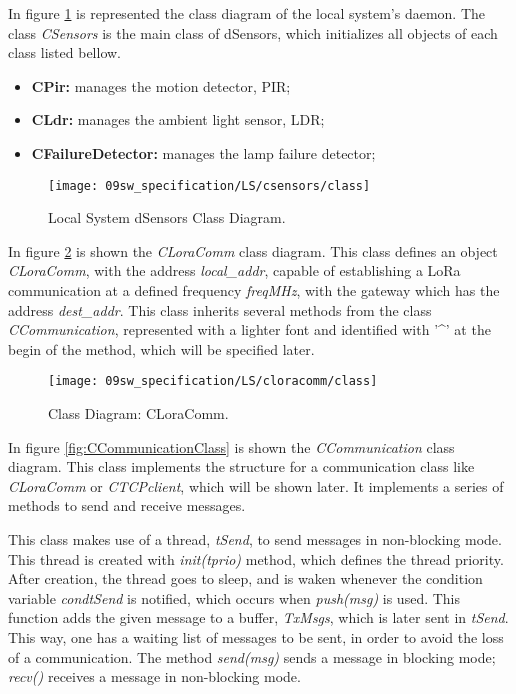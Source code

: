 \clearpage
In figure \ref{fig:csensors} is represented the class diagram of the local system's daemon. The class \textit{CSensors} is the main class of dSensors, which initializes all objects of each class listed bellow.

\begin{itemize}
	\item \textbf{CPir:} manages the motion detector, PIR;
	\item \textbf{CLdr:} manages the ambient light sensor, LDR;
	\item \textbf{CFailureDetector:} manages the lamp failure detector;
\end{itemize}

\begin{figure}[H]
	\centering
	\texttt{[image: 09sw\_specification/LS/csensors/class]}
	\caption{Local System dSensors Class Diagram.}
	\label{fig:csensors}
\end{figure}

\clearpage
{}

In figure \ref{fig:LoraCommClass} is shown the \textit{CLoraComm} class diagram. This class defines an object \textit{CLoraComm}, with the address \textit{local\_addr}, capable of establishing a LoRa communication at a defined frequency \textit{freqMHz}, with the gateway which has the address \textit{dest\_addr}. This class inherits several methods from the class \textit{CCommunication}, represented with a lighter font and identified with '\^{}' at the begin of the method, which will be specified later.

\begin{figure}[H]
	\centering
	\texttt{[image: 09sw\_specification/LS/cloracomm/class]}
	\caption{Class Diagram: CLoraComm.}
	\label{fig:LoraCommClass}
\end{figure}

\clearpage
{}

In figure \ref{fig:CCommunicationClass} is shown the \textit{CCommunication} class diagram. This class implements the structure for a communication class like \textit{CLoraComm} or \textit{CTCPclient}, which will be shown later. It implements a series of methods to send and receive messages. 

This class makes use of a thread, \textit{tSend}, to send messages in non-blocking mode. This thread is created with \textit{init(tprio)} method, which defines the thread priority. After creation, the thread goes to sleep, and is waken whenever the condition variable \textit{condtSend} is notified, which occurs when \textit{push(msg)} is used. This function adds the given message to a buffer, \textit{TxMsgs}, which is later sent in \textit{tSend}. This way, one has a waiting list of messages to be sent, in order to avoid the loss of a communication. The method \textit{send(msg)} sends a message in blocking mode; \textit{recv()} receives a message in non-blocking mode.

